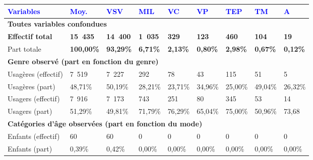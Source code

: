         \begin{longtable}{p{3.7cm}p{0.9cm}p{0.9cm}p{0.9cm}p{0.9cm}p{0.9cm}p{0.9cm}p{0.9cm}p{0.9cm}}
         \textcolor{blue}{\textbf{Variables}} & \textcolor{blue}{\textbf{Moy.}} & \textcolor{blue}{\textbf{VSV}} & \textcolor{blue}{\textbf{MIL}} & \textcolor{blue}{\textbf{VC}} & \textcolor{blue}{\textbf{VP}} & \textcolor{blue}{\textbf{TEP}} & \textcolor{blue}{\textbf{TM}} & \textcolor{blue}{\textbf{A}}\\
        \hline
        \endhead
\multicolumn{9}{l}{\textbf{Toutes variables confondues}}\\
    \small{\textbf{Effectif total}} & \small{\textbf{15~435}} & \small{\textbf{14~400}} & \small{\textbf{1~035}} & \small{\textbf{329}} & \small{\textbf{123}} & \small{\textbf{460}} & \small{\textbf{104}} & \small{\textbf{19}}\\
    \small{Part totale} & \small{\textbf{100,00\%}} & \small{\textbf{93,29\%}} & \small{\textbf{6,71\%}} & \small{\textbf{2,13\%}} & \small{\textbf{0,80\%}} & \small{\textbf{2,98\%}} & \small{\textbf{0,67\%}} & \small{\textbf{0,12\%}}\\
    \hline
\multicolumn{9}{l}{\textbf{Genre observé (part en fonction du genre)}}\\
    \small{Usagères (effectif)} & \small{7~519} & \small{7~227} & \small{292} & \small{78} & \small{43} & \small{115} & \small{51} & \small{5}\\
    \small{Usagères (part)} & \small{48,71\%} & \small{50,19\%} & \small{28,21\%} & \small{23,71\%} & \small{34,96\%} & \small{25,00\%} & \small{49,04\%} & \small{26,32\%}\\
    \small{Usagers (effectif)} & \small{7~916} & \small{7~173} & \small{743} & \small{251} & \small{80} & \small{345} & \small{53} & \small{14}\\
    \small{Usagers (part)} & \small{51,29\%} & \small{49,81\%} & \small{71,79\%} & \small{76,29\%} & \small{65,04\%} & \small{75,00\%} & \small{50,96\%} & \small{73,68}\\
    \hline
\multicolumn{9}{l}{\textbf{Catégories d'âge observées (part en fonction du mode)}}\\
    \small{Enfants (effectif)} & \small{60} & \small{60} & \small{0} & \small{0} & \small{0} & \small{0} & \small{0} & \small{0}\\
    \small{Enfants (part)} & \small{0,39\%} & \small{0,42\%} & \small{0,00\%} & \small{0,00\%} & \small{0,00\%} & \small{0,00\%} & \small{0,00\%} & \small{0,00\%}\\

\end{longtable}
